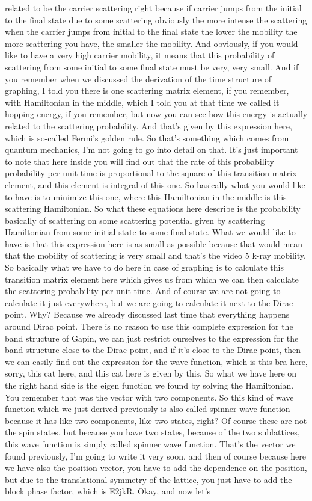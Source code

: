 related to be the carrier scattering right because if carrier jumps from the initial to the final state due to some scattering obviously the more intense the scattering when the carrier jumps from initial to the final state the lower the mobility the more scattering you have, the smaller the mobility. And obviously, if you would like to have a very high carrier mobility, it means that this probability of scattering from some initial to some final state must be very, very small. And if you remember when we discussed the derivation of the time structure of graphing, I told you there is one scattering matrix element, if you remember, with Hamiltonian in the middle, which I told you at that time we called it hopping energy, if you remember, but now you can see how this energy is actually related to the scattering probability. And that's given by this expression here, which is so-called Fermi's golden rule. So that's something which comes from quantum mechanics, I'm not going to go into detail on that. It's just important to note that here inside you will find out that the rate of this probability probability per unit time is proportional to the square of this transition matrix element, and this element is integral of this one. So basically what you would like to have is to minimize this one, where this Hamiltonian in the middle is this scattering Hamiltonian. So what these equations here describe is the probability basically of scattering on some scattering potential given by scattering Hamiltonian from some initial state to some final state. What we would like to have is that this expression here is as small as possible because that would mean that the mobility of scattering is very small and that's the video 5 k-ray mobility. So basically what we have to do here in case of graphing is to calculate this transition matrix element here which gives us from which we can then calculate the scattering probability per unit time. And of course we are not going to calculate it just everywhere, but we are going to calculate it next to the Dirac point. Why? Because we already discussed last time that everything happens around Dirac point. There is no reason to use this complete expression for the band structure of Gapin, we can just restrict ourselves to the expression for the band structure close to the Dirac point, and if it's close to the Dirac point, then we can easily find out the expression for the wave function, which is this bra here, sorry, this cat here, and this cat here is given by this. So what we have here on the right hand side is the eigen function we found by solving the Hamiltonian. You remember that was the vector with two components. So this kind of wave function which we just derived previously is also called spinner wave function because it has like two components, like two states, right? Of course these are not the spin states, but because you have two states, because of the two sublattices, this wave function is simply called spinner wave function. That's the vector we found previously, I'm going to write it very soon, and then of course because here we have also the position vector, you have to add the dependence on the position, but due to the translational symmetry of the lattice, you just have to add the block phase factor, which is E2jkR. Okay, and now let's 